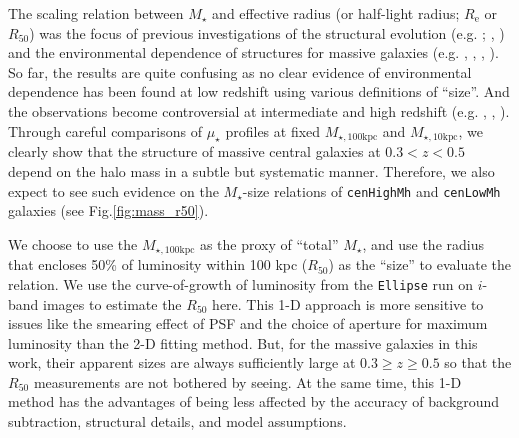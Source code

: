 \documentclass{emulateapj}
\def\rbcg{\texttt{cenHighMh}}
\def\nbcg{\texttt{cenLowMh}}
\def\mstar{{$M_{\star}$}}
\def\minn{{$M_{\star,10\mathrm{kpc}}$}}
\def\mtot{{$M_{\star,100\mathrm{kpc}}$}}
\def\mden{{$\mu_{\star}$}}
\newcommand{\update}[1]{\textcolor{Bittersweet}{#1}}
\begin{document}
\begin{CJK*}{UTF8}{gbsn}
    The scaling relation between \mstar{} and effective radius (or half-light radius;
    $R_{\mathrm{e}}$ or $R_{\mathrm{50}}$) 
    was the focus of previous investigations of the structural evolution 
    (e.g. \citealt{Shankar2013}; \citealt{Leja2013}, \citealt{vdWel2014}) and 
    the environmental dependence of structures for massive galaxies 
    (e.g. \citealt{Weinmann2009}, \citealt{Nair2010}, \citealt{HCompany13}, 
    \citealt{Cerbrian2014}). 
    So far, the results are quite confusing as no clear evidence of environmental 
    dependence has been found at low redshift using various definitions of ``size''. 
    And the observations become controversial at intermediate and high redshift
    (e.g. \citealt{MCooper2012}, \citealt{Papovich2012}, \citealt{Kelkar2015}).
    \update{
    Through careful comparisons of \mden{} profiles at fixed \mtot{} and \minn{}, 
    we clearly show that the structure of massive central galaxies at $0.3 < z < 0.5$
    depend on the halo mass in a subtle but systematic manner. 
    Therefore, we also expect to see such evidence on the \mstar{}-size relations 
    of \rbcg{} and \nbcg{} galaxies (see Fig.\ref{fig:mass_r50}).}
     
    We choose to use the \mtot{} as the proxy of ``total'' \mstar{}, and use the 
    radius that encloses 50\% of luminosity within 100 kpc ($R_{\mathrm{50}}$) as 
    the ``size'' to evaluate the relation.
    We use the curve-of-growth of luminosity from the \texttt{Ellipse} run on 
    $i$-band images to estimate the $R_{\mathrm{50}}$ here.
    This 1-D approach is more sensitive to issues like the smearing effect of PSF and 
    the choice of aperture for maximum luminosity than the 2-D fitting method.
    But, for the massive galaxies in this work, their apparent sizes are always 
    sufficiently large at $0.3 \geq z \geq 0.5$ so that the $R_{\mathrm{50}}$ 
    measurements are not bothered by seeing.  
    At the same time, this 1-D method has the advantages of being less affected by the 
    accuracy of background subtraction, structural details, and model assumptions.
    

\end{CJK*}
\end{document}
